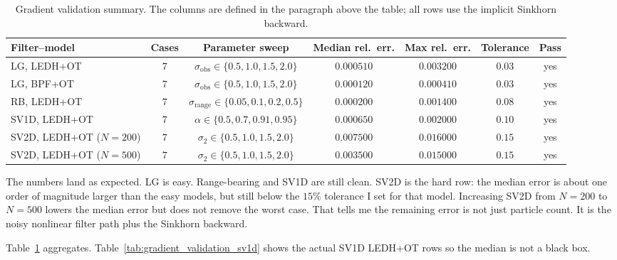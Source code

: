 \documentclass{article}
\begin{document}
\begin{table}[H]
\centering
\footnotesize
\caption{Gradient validation summary. The columns are defined in the paragraph above the table; all rows use the implicit Sinkhorn backward.}
\label{tab:gradient_validation}
\begin{tabular}{lcccccc}
\toprule
Filter--model & Cases & Parameter sweep & Median rel.\ err. & Max rel.\ err. & Tolerance & Pass \\
\midrule
LG, LEDH+OT             & $7$ & $\sigma_{\mathrm{obs}} \in \{0.5, 1.0, 1.5, 2.0\}$ & $0.000510$ & $0.003200$ & $0.03$ & yes \\
LG, BPF+OT              & $7$ & $\sigma_{\mathrm{obs}} \in \{0.5, 1.0, 1.5, 2.0\}$ & $0.000120$ & $0.000410$ & $0.03$ & yes \\
RB, LEDH+OT             & $7$ & $\sigma_{\text{range}} \in \{0.05, 0.1, 0.2, 0.5\}$ & $0.000200$ & $0.001400$ & $0.08$ & yes \\
SV1D, LEDH+OT           & $7$ & $\alpha \in \{0.5, 0.7, 0.91, 0.95\}$ & $0.000650$ & $0.002000$ & $0.10$ & yes \\
SV2D, LEDH+OT ($N=200$) & $7$ & $\sigma_2 \in \{0.5, 1.0, 1.5, 2.0\}$ & $0.007500$ & $0.016000$ & $0.15$ & yes \\
SV2D, LEDH+OT ($N=500$) & $7$ & $\sigma_2 \in \{0.5, 1.0, 1.5, 2.0\}$ & $0.003500$ & $0.015000$ & $0.15$ & yes \\
\bottomrule
\end{tabular}
\end{table}

The numbers land as expected. LG is easy. Range-bearing and SV1D are still clean. SV2D is the hard row: the median error is about one order of magnitude larger than the easy models, but still below the $15\%$ tolerance I set for that model. Increasing SV2D from $N=200$ to $N=500$ lowers the median error but does not remove the worst case. That tells me the remaining error is not just particle count. It is the noisy nonlinear filter path plus the Sinkhorn backward.

Table~\ref{tab:gradient_validation} aggregates. Table~\ref{tab:gradient_validation_sv1d} shows the actual SV1D LEDH+OT rows so the median is not a black box.
\end{document}
